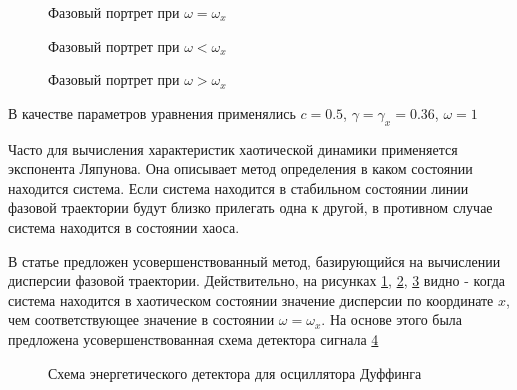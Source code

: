 \begin{figure}[H]
	\center{}
	\caption{Фазовый портрет при ${\omega =\omega_{x}}$}
	\label{pic:duffing_sync}
\end{figure}

\begin{figure}[H]
	\center{}
	\caption{Фазовый портрет при ${\omega < \omega_{x}}$}
	\label{pic:duffing_chaos1}
\end{figure}

\begin{figure}[H]
	\center{}
	\caption{Фазовый портрет при ${\omega > \omega_{x}}$}
	\label{pic:duffing_chaos2}
\end{figure}

В качестве параметров уравнения применялись $c = 0.5$, $\gamma=\gamma_{x}=0.36$, ${\omega=1}$

Часто для вычисления характеристик хаотической динамики применяется экспонента Ляпунова.
Она описывает метод определения в каком состоянии находится система. Если система находится
в стабильном состоянии линии фазовой траектории будут близко прилегать одна к другой, в противном
случае система находится в состоянии хаоса.

В статье \cite{chaos_chen} предложен усовершенствованный метод, базирующийся на вычислении дисперсии
фазовой траектории. Действительно, на рисунках \ref{pic:duffing_sync}, \ref{pic:duffing_chaos1},
\ref{pic:duffing_chaos2} видно - когда система находится в хаотическом состоянии значение
дисперсии по координате ${x}$, чем соответствующее значение в состоянии $\omega = \omega_{x}$.
На основе этого была предложена усовершенствованная схема детектора сигнала
\ref{pic:chaos_energy_detector}

\begin{figure}[H]
	\center{}
	\caption{Схема энергетического детектора для осциллятора Дуффинга}
	\label{pic:chaos_energy_detector}
\end{figure}

\newpage
